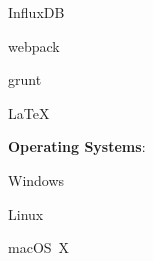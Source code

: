 \documentclass[showframe,showboundingboxes]{resume} %
\begin{document}
\begin{minipage}[c]{\linewidth}
\begin{multicols*}{3}
\begin{multicols}{2}
\begin{loneinnerlist}
				\item InfluxDB
				\item webpack
				\item grunt
				\item \LaTeX
			\end{loneinnerlist}
		\end{multicols}
		\columnbreak
		\textbf{Operating Systems}:
			\begin{loneinnerlist}
				\item Windows
				\item Linux
				\item macOS~X
				\item[]
				\item[]
			\end{loneinnerlist}
	\end{multicols*}%
	\end{minipage}%
	\vspace*{0.25\baselineskip}
\end{document}
